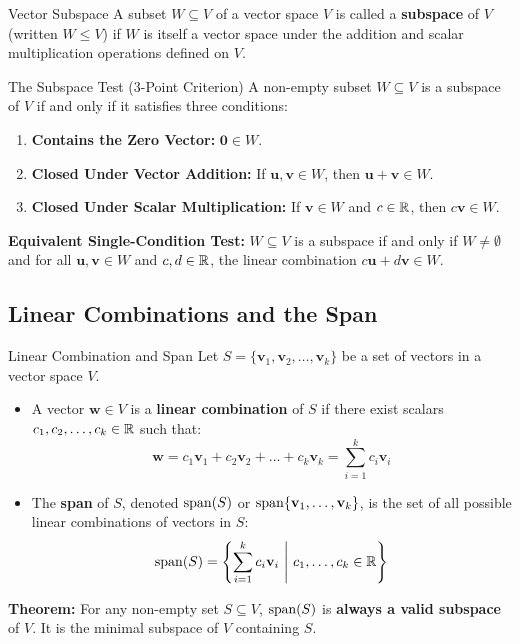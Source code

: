 \begin{definitionbox}{Vector Subspace}
A subset $W \subseteq V$ of a vector space $V$ is called a \textbf{subspace} of $V$ (written $W \le V$) if $W$ is itself a vector space under the addition and scalar multiplication operations defined on $V$.
\end{definitionbox}

\begin{theorembox}{The Subspace Test (3-Point Criterion)}
A non-empty subset $W \subseteq V$ is a subspace of $V$ if and only if it satisfies three conditions:
\begin{enumerate}
    \item \textbf{Contains the Zero Vector:} $\mathbf{0} \in W$.
    \item \textbf{Closed Under Vector Addition:} If $\mathbf{u}, \mathbf{v} \in W$, then $\mathbf{u} + \mathbf{v} \in W$.
    \item \textbf{Closed Under Scalar Multiplication:} If $\mathbf{v} \in W$ and $c \in \mathbb{R}$, then $c\mathbf{v} \in W$.
\end{enumerate}
\textbf{Equivalent Single-Condition Test:} $W \subseteq V$ is a subspace if and only if $W \neq \emptyset$ and for all $\mathbf{u}, \mathbf{v} \in W$ and $c, d \in \mathbb{R}$, the linear combination $c\mathbf{u} + d\mathbf{v} \in W$.
\end{theorembox}

\subsection{Linear Combinations and the Span}

\begin{definitionbox}{Linear Combination and Span}
Let $S = \{\mathbf{v}_1, \mathbf{v}_2, \dots, \mathbf{v}_k\}$ be a set of vectors in a vector space $V$.
\begin{itemize}
    \item A vector $\mathbf{w} \in V$ is a \textbf{linear combination} of $S$ if there exist scalars $c_1, c_2, \dots, c_k \in \mathbb{R}$ such that:
    \begin{equation}
    \mathbf{w} = c_1 \mathbf{v}_1 + c_2 \mathbf{v}_2 + \dots + c_k \mathbf{v}_k = \sum_{i=1}^k c_i \mathbf{v}_i
    \end{equation}
    \item The \textbf{span} of $S$, denoted $\operatorname{span}(S)$ or $\operatorname{span}\{\mathbf{v}_1, \dots, \mathbf{v}_k\}$, is the set of all possible linear combinations of vectors in $S$:
    \begin{equation}
    \operatorname{span}(S) = \left\{ \sum_{i=1}^k c_i \mathbf{v}_i \ \middle|\ c_1, \dots, c_k \in \mathbb{R} \right\}
    \end{equation}
\end{itemize}
\textbf{Theorem:} For any non-empty set $S \subseteq V$, $\operatorname{span}(S)$ is \textbf{always a valid subspace} of $V$. It is the minimal subspace of $V$ containing $S$.
\end{definitionbox}

